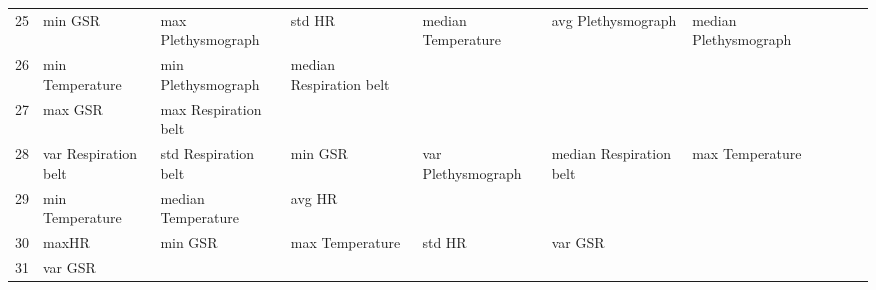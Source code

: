 \begin{landscape}
\begin{table}[]
\begin{tabular}{l|llllllll}
25       & min GSR                 & max Plethysmograph      & std HR                  & median Temperature      & avg Plethysmograph      & median Plethysmograph &                         &                         &                         &         \\
26       & min Temperature         & min Plethysmograph      & median Respiration belt &                         &                         &                       &                         &                         &                         &         \\
27       & max GSR                 & max Respiration belt    &                         &                         &                         &                       &                         &                         &                         &         \\
28       & var Respiration belt    & std Respiration belt    & min GSR                 & var Plethysmograph      & median Respiration belt & max Temperature       &                         &                         &                         &         \\
29       & min Temperature         & median Temperature      & avg HR                  &                         &                         &                       &                         &                         &                         &         \\
30       & maxHR                   & min GSR                 & max Temperature         & std HR                  & var GSR                 &                       &                         &                         &                         &         \\
31       & var GSR                 &                         &                         &                         &                         &                       &                         &                         &                         &         \\
\end{tabular}
\end{table}
\end{landscape}
\clearpage
